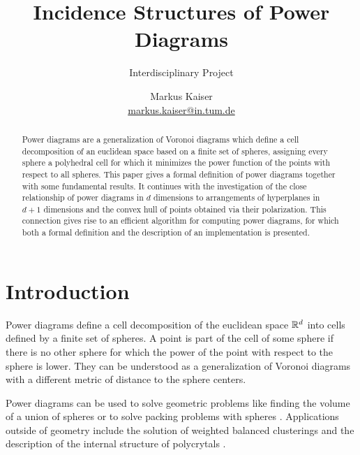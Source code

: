 




\title{Incidence Structures of Power Diagrams}
\subtitle{Interdisciplinary Project}
\author{%
    \texorpdfstring{Markus Kaiser\\\href{mailto:markus.kaiser@in.tum.de}{markus.kaiser@in.tum.de}}{Markus Kaiser}}
\publishers{Technische Universität München}


\maketitle
\thispagestyle{empty}
\vfill
\begin{abstract}
    Power diagrams are a generalization of Voronoi diagrams which define a cell decomposition of an euclidean space based on a finite set of spheres, assigning every sphere a polyhedral cell for which it minimizes the power function of the points with respect to all spheres.
    This paper gives a formal definition of power diagrams together with some fundamental results.
    It continues with the investigation of the close relationship of power diagrams in $d$ dimensions to arrangements of hyperplanes in $d+1$ dimensions and the convex hull of points obtained via their polarization.
    This connection gives rise to an efficient algorithm for computing power diagrams, for which both a formal definition and the description of an implementation is presented.
\end{abstract}
\vfill

\clearpage
\tableofcontents

\section{Introduction}
\label{sec:introduction}
Power diagrams define a cell decomposition of the euclidean space $\mathbb{R}^d$ into cells defined by a finite set of spheres.
A point is part of the cell of some sphere if there is no other sphere for which the power of the point with respect to the sphere is lower.
They can be understood as a generalization of Voronoi diagrams with a different metric of distance to the sphere centers.

Power diagrams can be used to solve geometric problems like finding the volume of a union of spheres \cite{avis1988computing} or to solve packing problems with spheres \cite{toth2013lagerungen}.
Applications outside of geometry include the solution of weighted balanced clusterings \cite{brieden2012optimal} and the description of the internal structure of polycrytals \cite{alpers2015generalized}.

